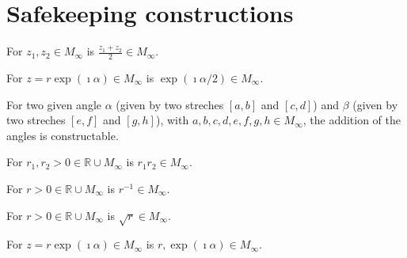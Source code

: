 \section{Safekeeping constructions}

\begin{lemma}
    \label{construction_midpoint}
    For $z_1, z_2 \in M_{\infty}$ is $\frac{z_1 + z_2}{2} \in M_{\infty}$.
\end{lemma}

\begin{lemma}
    \label{lem:construction_halving_angle}
    For $z = r \exp(\imath \alpha) \in M_{\infty}$ is $\exp(\imath \alpha / 2) \in M_{\infty}$.
\end{lemma}


\begin{lemma}
    \label{construction_add_angle}
    For two given angle $\alpha$ (given by two streches $[a,b]$ and $[c,d]$) and $\beta$ (given by two streches $[e,f]$ and $[g,h]$), with $ a,b,c,d,e,f,g,h \in M_{\infty}$, the addition of the angles is constructable.
\end{lemma}

\begin{lemma}
    \label{construction_mult_pos_real}
    For $r_1, r_2 > 0 \in \mathbb{R}\cup M_{\infty}$ is $r_1 r_2 \in M_{\infty}$.
\end{lemma}

\begin{lemma}
    \label{construction_inv_pos_real}
    For $r > 0\in \mathbb{R}\cup M_{\infty}$ is $r^{-1} \in M_{\infty}$.
\end{lemma}

\begin{lemma}
    \label{construction_sqrt_pos_real}
    For $r > 0 \in \mathbb{R}\cup M_{\infty}$ is $\sqrt{r} \in M_{\infty}$.
\end{lemma}

\begin{lemma}
    \label{construction_polar}
    For $z = r \exp(\imath \alpha) \in M_{\infty}$ is $r, \allowbreak \exp(\imath \alpha) \in M_{\infty}$.
\end{lemma}

